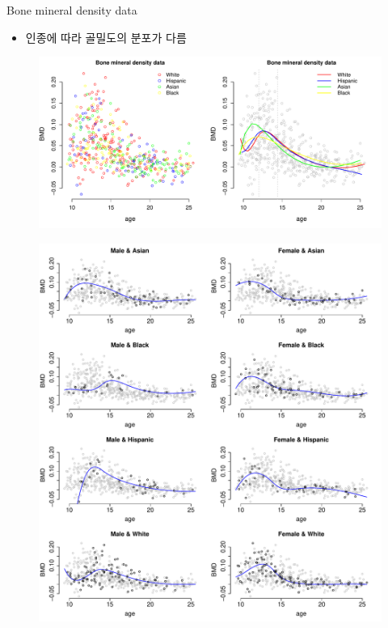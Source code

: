 \begin{frame}{Bone mineral density data}
\begin{itemize}
\item 인종에 따라 골밀도의 분포가 다름
\end{itemize}
\begin{figure}
\includegraphics[scale=0.35]{BMD_e}
\end{figure}
\end{frame}

\begin{frame}
\begin{figure}
\includegraphics[scale=0.3]{gridz8_blue}
\end{figure}
\end{frame}
